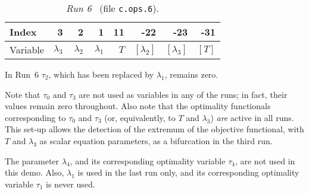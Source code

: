 \documentclass[12pt]{report}
\begin{document}
\begin{table}[htbp]
\begin{center}
\begin{tabular}{| l | r | r | r | r | r | r | r |}
\hline
  Index& 3 & ~2 & ~1 & 11  & -22 & -23 & -31 \\
\hline
  Variable& $\lambda_3$ & $\lambda_2$ & $\lambda_1$ & $T$  
  & $[\lambda_2]$ & $[\lambda_3]$ & $[T]$ \\
\hline
\end{tabular}
\caption{{\it Run 6}~ (file {\tt c.ops.6}).}
\label{tbl:demo_ops_3}
\end{center}
\end{table}


In Run~6 $\tau_2$, which has been replaced by $\lambda_1$, remains zero.


Note that $\tau_0$ and $\tau_3$ are not used as variables in any
of the runs; in fact, their values remain zero throughout.
Also note that the optimality functionals corresponding to 
$\tau_0$ and $\tau_3$ (or, equivalently, to $T$ and $\lambda_3$) 
{\it are} active in all runs.
This set-up allows the detection of the extremum of the objective functional,
with $T$ and $\lambda_3$ as scalar equation parameters,
as a bifurcation in the third run.

The parameter $\lambda_4$, and its corresponding optimality variable $\tau_4$,
are not used in this demo.
Also, $\lambda_1$ is used in the last run only, and its corresponding 
optimality variable $\tau_1$ is never used.
\end{document}
